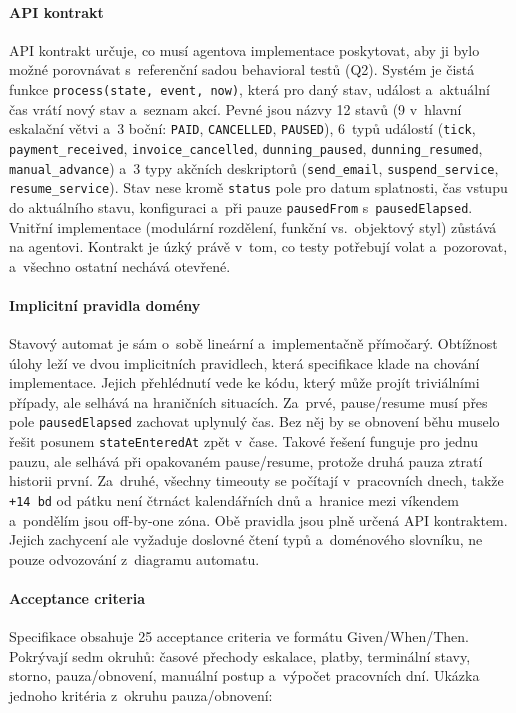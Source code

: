 \paragraph{API kontrakt}
API kontrakt určuje, co musí agentova implementace poskytovat, aby ji
bylo možné porovnávat s~referenční sadou behavioral testů (\acs{Q2}).
Systém je čistá funkce \texttt{process(state, event, now)}, která
pro daný stav, událost a~aktuální čas vrátí nový stav a~seznam akcí.
Pevné jsou názvy 12 stavů (9 v~hlavní eskalační větvi a~3 boční:
\texttt{PAID}, \texttt{CANCELLED}, \texttt{PAUSED}), 6~typů událostí
(\texttt{tick}, \texttt{payment\_received}, \texttt{invoice\_cancelled},
\texttt{dunning\_paused}, \texttt{dunning\_resumed},
\texttt{manual\_advance}) a~3 typy akčních deskriptorů
(\texttt{send\_email}, \texttt{suspend\_service},
\texttt{resume\_service}). Stav nese kromě \texttt{status} pole pro
datum splatnosti, čas vstupu do aktuálního stavu, konfiguraci a~při
pauze \texttt{pausedFrom} s~\texttt{pausedElapsed}. Vnitřní
implementace (modulární rozdělení, funkční vs.\ objektový styl)
zůstává na agentovi. Kontrakt je úzký právě v~tom, co testy potřebují
volat a~pozorovat, a~všechno ostatní nechává otevřené.

\paragraph{Implicitní pravidla domény}
Stavový automat je sám o~sobě lineární a~implementačně přímočarý.
Obtížnost úlohy leží ve dvou implicitních pravidlech, která
specifikace klade na chování implementace. Jejich přehlédnutí vede
ke kódu, který může projít triviálními případy, ale selhává na
hraničních situacích. Za~prvé,
pause/resume musí přes pole \texttt{pausedElapsed} zachovat uplynulý
čas. Bez něj by se obnovení běhu muselo řešit posunem
\texttt{stateEnteredAt} zpět v~čase. Takové řešení funguje pro jednu
pauzu, ale selhává při opakovaném pause/resume, protože druhá pauza
ztratí historii první.
Za~druhé, všechny timeouty se počítají v~pracovních dnech, takže
\texttt{+14\,bd} od pátku není čtrnáct kalendářních dnů a~hranice
mezi víkendem a~pondělím jsou off-by-one zóna. Obě pravidla jsou
plně určená API kontraktem. Jejich zachycení ale vyžaduje doslovné
čtení typů a~doménového slovníku, ne pouze odvozování z~diagramu
automatu.

\paragraph{Acceptance criteria}
Specifikace obsahuje 25 acceptance criteria ve formátu Given/When/Then.
Pokrývají sedm okruhů: časové přechody eskalace, platby, terminální
stavy, storno, pauza/obnovení, manuální postup a~výpočet pracovních
dní. Ukázka jednoho kritéria z~okruhu pauza/obnovení:


